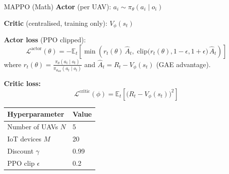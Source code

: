 \documentclass[aspectratio=169,12pt]{beamer}
\begin{document}
\begin{frame}{MAPPO (Math)}
\textbf{Actor} (per UAV): $a_i \sim \pi_\theta(a_i \mid o_i)$

\vspace{0.3em}
\textbf{Critic} (centralised, training only): $V_\phi(s_t)$

\vspace{0.3em}
\textbf{Actor loss} (PPO clipped):
\[
\mathcal{L}^{\text{actor}}(\theta)
= -\mathbb{E}_t\!\left[
  \min\!\left(
    r_t(\theta)\,\hat{A}_t,\;
    \text{clip}\bigl(r_t(\theta), 1{-}\epsilon, 1{+}\epsilon\bigr)\,\hat{A}_t
  \right)
\right]
\]
where $r_t(\theta) = \frac{\pi_\theta(a_t \mid o_t)}{\pi_{\theta_{\text{old}}}(a_t \mid o_t)}$ and $\hat{A}_t = R_t - V_\phi(s_t)$ (GAE advantage).

\vspace{0.3em}
\textbf{Critic loss:}
\[
\mathcal{L}^{\text{critic}}(\phi)
= \mathbb{E}_t\!\left[
  \bigl(R_t - V_\phi(s_t)\bigr)^2
\right]
\]

\vspace{0.3em}
\begin{tabular}{@{}ll@{}}
\toprule
\textbf{Hyperparameter} & \textbf{Value} \\
\midrule
Number of UAVs $N$ & 5 \\
IoT devices $M$ & 20 \\
Discount $\gamma$ & 0.99 \\
PPO clip $\epsilon$ & 0.2 \\
\bottomrule
\end{tabular}
\end{frame}

\end{document}
